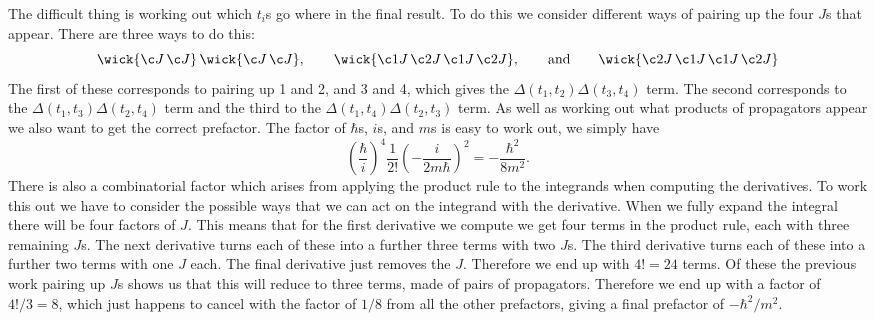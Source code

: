 \documentclass[fleqn]{NotesClass}
\begin{document}
    The difficult thing is working out which \(t_i\)s go where in the final result.
    To do this we consider different ways of pairing up the four \(J\)s that appear.
    There are three ways to do this:
    \begin{equation}
        \wick{\c J \, \c J} \, \wick{\c J \, \c J}, \qquad \wick{\c1 J \, \c2 J \, \c1 J \, \c2 J}, \qquad\text{and}\qquad \wick{\c2 J \, \c1 J \, \c1 J \, \c2 J}
    \end{equation}
    The first of these corresponds to pairing up 1 and 2, and 3 and 4, which gives the \(\Delta(t_1, t_2)\Delta(t_3, t_4)\) term.
    The second corresponds to the \(\Delta(t_1, t_3)\Delta(t_2, t_4)\) term and the third to the \(\Delta(t_1, t_4)\Delta(t_2, t_3)\) term.
    As well as working out what products of propagators appear we also want to get the correct prefactor.
    The factor of \(\hbar\)s, \(i\)s, and \(m\)s is easy to work out, we simply have
    \begin{equation}
        \left( \frac{\hbar}{i} \right)^4\frac{1}{2!}\left( -\frac{i}{2m\hbar} \right)^2 = -\frac{\hbar^2}{8m^2}.
    \end{equation}
    There is also a combinatorial factor which arises from applying the product rule to the integrands when computing the derivatives.
    To work this out we have to consider the possible ways that we can act on the integrand with the derivative.
    When we fully expand the integral there will be four factors of \(J\).
    This means that for the first derivative we compute we get four terms in the product rule, each with three remaining \(J\)s.
    The next derivative turns each of these into a further three terms with two \(J\)s.
    The third derivative turns each of these into a further two terms with one \(J\) each.
    The final derivative just removes the \(J\).
    Therefore we end up with \(4! = 24\) terms.
    Of these the previous work pairing up \(J\)s shows us that this will reduce to three terms, made of pairs of propagators.
    Therefore we end up with a factor of \(4!/3 = 8\), which just happens to cancel with the factor of \(1/8\) from all the other prefactors, giving a final prefactor of \(-\hbar^2/m^2\).
    
\end{document}

